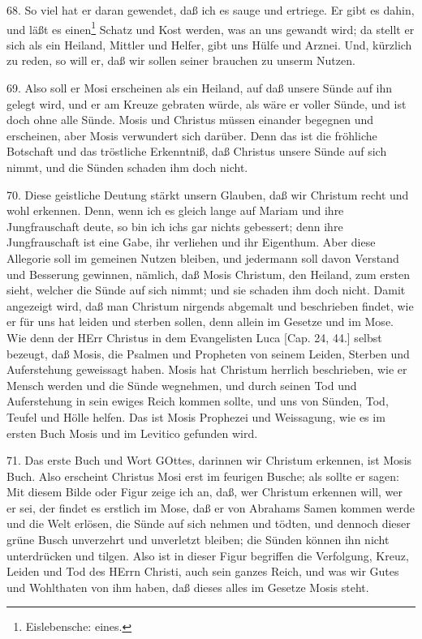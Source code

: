 68. So viel hat er daran gewendet, daß ich es sauge und ertriege. Er gibt es dahin, und läßt es einen\footnote{Eislebensche: eines.} Schatz und Kost werden, was an uns gewandt wird; da stellt er sich als ein Heiland, Mittler und Helfer, gibt uns Hülfe und Arznei. Und, kürzlich zu reden, so will er, daß wir sollen seiner brauchen zu unserm Nutzen.

69. Also soll er Mosi erscheinen als ein Heiland, auf daß unsere Sünde auf ihn gelegt wird, und er am Kreuze gebraten würde, als wäre er voller Sünde, und ist doch ohne alle Sünde. Mosis und Christus müssen einander begegnen und erscheinen, aber Mosis verwundert sich darüber. Denn das ist die fröhliche Botschaft und das tröstliche Erkenntniß, daß Christus unsere Sünde auf sich nimmt, und die Sünden schaden ihm doch nicht.

70. Diese geistliche Deutung stärkt unsern Glauben, daß wir Christum recht und wohl erkennen. Denn, wenn ich es gleich lange auf Mariam und ihre Jungfrauschaft deute, so bin ich ichs gar nichts gebessert; denn ihre Jungfrauschaft ist eine Gabe, ihr verliehen und ihr Eigenthum. Aber diese Allegorie soll im gemeinen Nutzen bleiben, und jedermann soll davon Verstand und Besserung gewinnen, nämlich, daß Mosis Christum, den Heiland, zum ersten sieht, welcher die Sünde auf sich nimmt; und sie schaden ihm doch nicht. Damit angezeigt wird, daß man Christum nirgends abgemalt und beschrieben findet, wie er für uns hat leiden und sterben sollen, denn allein im Gesetze und im Mose. Wie denn der HErr Christus in dem Evangelisten Luca [Cap. 24, 44.] selbst bezeugt, daß Mosis, die Psalmen und Propheten von seinem Leiden, Sterben und Auferstehung geweissagt haben. Mosis hat Christum herrlich beschrieben, wie er Mensch werden und die Sünde wegnehmen, und durch seinen Tod und Auferstehung in sein ewiges Reich kommen sollte, und uns von Sünden, Tod, Teufel und Hölle helfen. Das ist Mosis Prophezei und Weissagung, wie es im ersten Buch Mosis und im Levitico gefunden wird.

71. Das erste Buch und Wort GOttes, darinnen wir Christum erkennen, ist Mosis Buch. Also erscheint Christus Mosi erst im feurigen Busche; als sollte er sagen: Mit diesem Bilde oder Figur zeige ich an, daß, wer Christum erkennen will, wer er sei, der findet es erstlich im Mose, daß er von Abrahams Samen kommen werde und die Welt erlösen, die Sünde auf sich nehmen und tödten, und dennoch dieser grüne Busch unverzehrt und unverletzt bleiben; die Sünden können ihn nicht unterdrücken und tilgen. Also ist in dieser Figur begriffen die Verfolgung, Kreuz, Leiden und Tod des HErrn Christi, auch sein ganzes Reich, und was wir Gutes und Wohlthaten von ihm haben, daß dieses alles im Gesetze Mosis steht.


